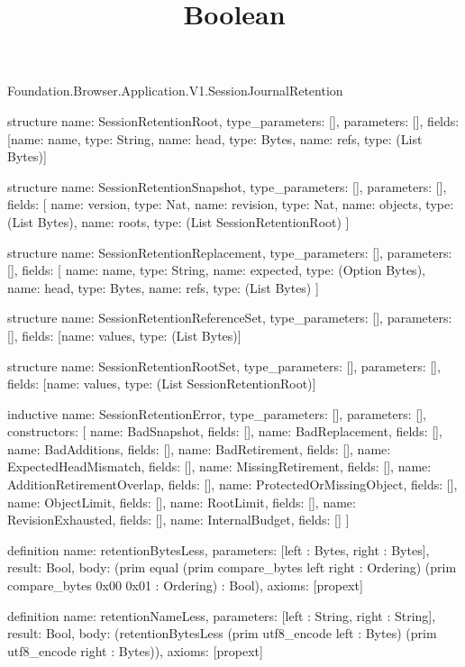 \begin{lexlean}{Foundation.Browser.Application.V1.SessionJournalRetention}
\title{Boolean}
\begin{semanticmodule}
structure{
  name: SessionRetentionRoot,
  type_parameters: [],
  parameters: [],
  fields: [{name: name, type: String}, {name: head, type: Bytes}, {name: refs, type: (List Bytes)}]
}

structure{
  name: SessionRetentionSnapshot,
  type_parameters: [],
  parameters: [],
  fields: [
    {name: version, type: Nat},
    {name: revision, type: Nat},
    {name: objects, type: (List Bytes)},
    {name: roots, type: (List SessionRetentionRoot)}
  ]
}

structure{
  name: SessionRetentionReplacement,
  type_parameters: [],
  parameters: [],
  fields: [
    {name: name, type: String},
    {name: expected, type: (Option Bytes)},
    {name: head, type: Bytes},
    {name: refs, type: (List Bytes)}
  ]
}

structure{
  name: SessionRetentionReferenceSet,
  type_parameters: [],
  parameters: [],
  fields: [{name: values, type: (List Bytes)}]
}

structure{
  name: SessionRetentionRootSet,
  type_parameters: [],
  parameters: [],
  fields: [{name: values, type: (List SessionRetentionRoot)}]
}

inductive{
  name: SessionRetentionError,
  type_parameters: [],
  parameters: [],
  constructors: [
    {name: BadSnapshot, fields: []},
    {name: BadReplacement, fields: []},
    {name: BadAdditions, fields: []},
    {name: BadRetirement, fields: []},
    {name: ExpectedHeadMismatch, fields: []},
    {name: MissingRetirement, fields: []},
    {name: AdditionRetirementOverlap, fields: []},
    {name: ProtectedOrMissingObject, fields: []},
    {name: ObjectLimit, fields: []},
    {name: RootLimit, fields: []},
    {name: RevisionExhausted, fields: []},
    {name: InternalBudget, fields: []}
  ]
}

definition{
  name: retentionBytesLess,
  parameters: [left : Bytes, right : Bytes],
  result: Bool,
  body: (prim equal (prim compare_bytes left right : Ordering) (prim compare_bytes 0x00 0x01 : Ordering) : Bool),
  axioms: [propext]
}

definition{
  name: retentionNameLess,
  parameters: [left : String, right : String],
  result: Bool,
  body: (retentionBytesLess (prim utf8_encode left : Bytes) (prim utf8_encode right : Bytes)),
  axioms: [propext]
}


\end{semanticmodule}
\end{lexlean}
